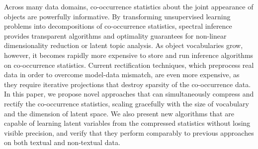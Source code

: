 Across many data domains, co\hyp{}occurrence statistics about the joint
appearance of objects are powerfully informative. By transforming unsupervised
learning problems into decompositions of co\hyp{}occurrence statistics, spectral
inference provides transparent algorithms and optimality guarantees for
non-linear dimensionality reduction or latent topic analysis. As object
vocabularies grow, however, it becomes rapidly more expensive to store and run
inference algorithms on co\hyp{}occurrence statistics. Current rectification
techniques, which preprocess real data in order to overcome model-data mismatch,
are even more expensive, as they require iterative projections that destroy
sparsity of the co\hyp{}occurrence data. In this paper, we propose novel
approaches that can simultaneously compress and rectify the co\hyp{}occurrence
statistics, scaling gracefully with the size of vocabulary and the dimension of
latent space. We also present new algorithms that are capable of learning latent
variables from the compressed statistics without losing visible precision, and
verify that they perform comparably to previous approaches on both textual and
non-textual data.
